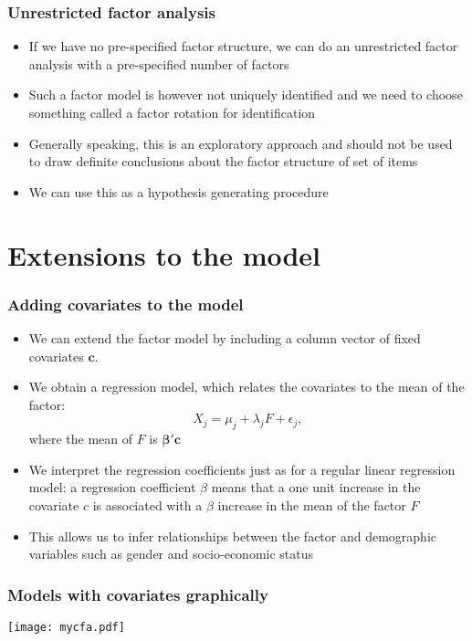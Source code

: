 \documentclass[compress]{beamer}
\begin{document}
\begin{frame}[fragile]
\frametitle{Unrestricted factor analysis}
\begin{itemize}
\item If we have no pre-specified factor structure, we can do an unrestricted factor analysis with a pre-specified number of factors
\item Such a factor model is however not uniquely identified and we need to choose something called a factor rotation for identification
\item Generally speaking, this is an exploratory approach and should not be used to draw definite conclusions about the factor structure of set of items
\item We can use this as a hypothesis generating procedure
\end{itemize}
\end{frame}



\section*{Extensions to the model}
\begin{frame}[fragile]
\frametitle{Adding covariates to the model}
\begin{itemize}
\item We can extend the factor model by including a column vector of fixed covariates $\boldsymbol c$.
\item We obtain a regression model, which relates the covariates to the mean of the factor:
\[
X_j = \mu_j + \lambda_jF + \epsilon_j,
\]
where the mean of $F$ is $\boldsymbol\beta'\boldsymbol c$
\item We interpret the regression coefficients just as for a regular linear regression model: a regression coefficient $\beta$ means that a one unit increase in the covariate $c$ is associated with a $\beta$ increase in the mean of the factor $F$
\item This allows us to infer relationships between the factor and demographic variables such as gender and socio-economic status
\end{itemize}
\end{frame}

\begin{frame}[fragile]
\frametitle{Models with covariates graphically}
\texttt{[image: mycfa.pdf]}

\end{frame}
\end{document}
